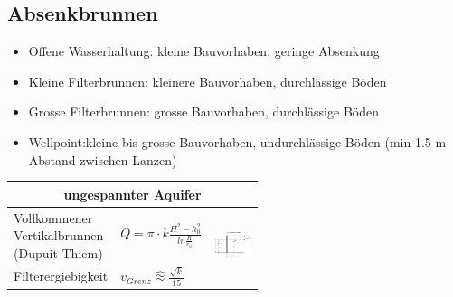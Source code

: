 \begin{minipage}{\linewidth}
	\vspace{-0.5cm}
	\subsection{Absenkbrunnen}
	
	\begin{itemize}
		\item Offene Wasserhaltung: kleine Bauvorhaben, geringe Absenkung
		\item Kleine Filterbrunnen: kleinere Bauvorhaben, durchlässige Böden
		\item Grosse Filterbrunnen: grosse Bauvorhaben, durchlässige Böden
		\item Wellpoint:kleine bis grosse Bauvorhaben, undurchlässige Böden (min 1.5 m Abstand zwischen Lanzen)
		
	\end{itemize}
	
	\begin{tabular}{p{0.3\linewidth}|l|p{0.25\linewidth}}
		
		\multicolumn{3}{c|}{ \textbf{ungespannter Aquifer} } \\ \hline
		
		Vollkommener Vertikalbrunnen (Dupuit-Thiem) & $ Q = \pi \cdot k \frac{H^2 - h_0^2}{ln \frac{R}{r_0} } $	& \multirow{2}{*}{\includegraphics[width=0.8\linewidth]{images/GW9ungespAquifer.PNG}}  \\
		Filterergiebigkeit & $ v_{Grenz} \hat{\approx} \frac{\sqrt{k}}{15}$	&\\ \hline
		

\end{tabular}
\end{minipage}
